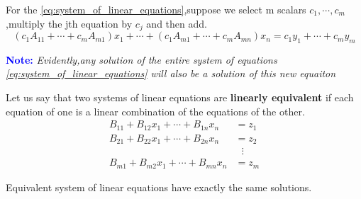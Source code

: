 \documentclass[11pt, a4paper, oneside,UTF8]{ctexbook}
\newenvironment{note}
{\par\textcolor{blue}{\bfseries Note:}\itshape}
{\par}
\newtheorem[M]{theorem}{Theorem}[section]
\newtheorem[M]{lemma}[theorem]{Lemma}
\newtheorem[M]{proposition}[theorem]{Proposition}
\newtheorem[M]{corollary}[theorem]{Corollary}
\newtheorem[M]{definition}{Definition}[section]
\begin{document}
\begin{definition}
	For the \ref{eq:system_of_linear_equations},suppose we select m scalars $c_1,\cdots,c_m$,multiply the jth equation by $c_j$ and then add.
	\begin{displaymath}
		(c_1A_{11}+\cdots+c_mA_{m1})x_1+\cdots+(c_1A_{m1}+\cdots+c_mA_{mn})x_n = c_1y_1+\cdots+c_my_m
	\end{displaymath}
\end{definition}

\begin{note}
	Evidently,any solution of the entire system of equations \ref{eq:system_of_linear_equations} will also be a solution of this new equaiton
\end{note}
\newpage
\begin{definition}
	Let us say that two systems of linear equations are \textbf{linearly equivalent} if each equation of one is a linear combination of the equations of the other.
	\begin{equation}
		\begin{aligned}
			B_{11}+B_{12}x_1+\cdots+B_{1n}x_n & = z_1           \\
			B_{21}+B_{22}x_1+\cdots+B_{2n}x_n & = z_2           \\
			                                  & \,\,\,\, \vdots \\
			B_{m1}+B_{m2}x_1+\cdots+B_{mn}x_n & = z_m
		\end{aligned}
		\label{eq:linear_equivalent}
	\end{equation}
\end{definition}

\begin{theorem}
	Equivalent system of linear equations have exactly the same solutions.
\end{theorem}
\end{document}
